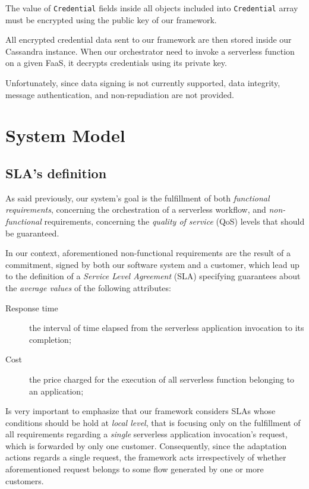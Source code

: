 \documentclass[12pt,a4paper]{report}
\begin{document}
The value of \texttt{Credential} fields inside all objects included into \texttt{Credential} array must be encrypted using the public key of our framework. 

All encrypted credential data sent to our framework are then stored inside our Cassandra instance. When our orchestrator need to invoke a serverless function on a given FaaS, it decrypts credentials using its private key.

Unfortunately, since data signing is not currently supported, data integrity, message authentication, and non-repudiation are not provided.

\chapter{System Model}

\section{SLA's definition}

As said previously, our system's goal is the fulfillment of both \textit{functional requirements}, concerning the orchestration of a serverless workflow, and \textit{non-functional} requirements, concerning the \textit{quality of service} (QoS) levels that should be guaranteed.

In our context, aforementioned non-functional requirements are the result of a commitment, signed by both our software system and a customer, which lead  up to the definition of a \textit{Service Level Agreement} (SLA) specifying guarantees about the \textit{average values} of the following attributes:

\begin{description}
	\item[Response time] the interval of time elapsed from the
	serverless application invocation to its completion;
	\item[Cost] the price charged for the execution of all serverless function belonging to an application;
\end{description}

Is very important to emphasize that our framework considers SLAs whose conditions should be hold at \textit{local level}, that is focusing only on the fulfillment of all requirements regarding a \textit{single} serverless application invocation's request, which is forwarded by only one customer. Consequently, since the adaptation actions regards a single request, the framework acts irrespectively of whether aforementioned request belongs to some flow generated by one or more customers.
\end{document}
